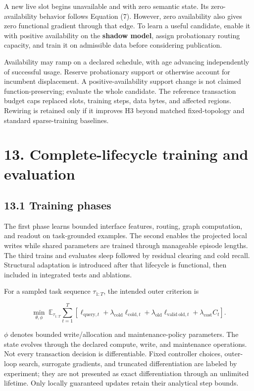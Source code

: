 \documentclass[
  11pt,
  a4paper,
]{article}
\begin{document}
A new live slot begins unavailable and with zero semantic state. Its
zero-availability behavior follows Equation (7). However, zero
availability also gives zero functional gradient through that edge. To
learn a useful candidate, enable it with positive availability on the
\textbf{shadow model}, assign probationary routing capacity, and train
it on admissible data before considering publication.

Availability may ramp on a declared schedule, with age advancing
independently of successful usage. Reserve probationary support or
otherwise account for incumbent displacement. A positive-availability
support change is not claimed function-preserving; evaluate the whole
candidate. The reference transaction budget caps replaced slots,
training steps, data bytes, and affected regions. Rewiring is retained
only if it improves H3 beyond matched fixed-topology and standard
sparse-training baselines.

\section{13. Complete-lifecycle training and
evaluation}\label{complete-lifecycle-training-and-evaluation}

\subsection{13.1 Training phases}\label{training-phases}

The first phase learns bounded interface features, routing, graph
computation, and readout on task-grounded examples. The second enables
the projected local writes while shared parameters are trained through
manageable episode lengths. The third trains and evaluates sleep
followed by residual clearing and cold recall. Structural adaptation is
introduced after that lifecycle is functional, then included in
integrated tests and ablations.

For a sampled task sequence \(\tau_{1:T}\), the intended outer criterion
is

\[
\min_{\theta,\phi}\;
\mathbb E_{\tau_{1:T}}
\sum_{t=1}^T\left[
\ell_{\mathrm{query},t}
+\lambda_{\mathrm{cold}}\ell_{\mathrm{cold},t}
+\lambda_{\mathrm{old}}\ell_{\mathrm{valid\ old},t}
+\lambda_{\mathrm{cost}}C_t
\right].
\tag{34}
\]

\(\phi\) denotes bounded write/allocation and maintenance-policy
parameters. The state evolves through the declared compute, write, and
maintenance operations. Not every transaction decision is
differentiable. Fixed controller choices, outer-loop search, surrogate
gradients, and truncated differentiation are labeled by experiment; they
are not presented as exact differentiation through an unlimited
lifetime. Only locally guaranteed updates retain their analytical step
bounds.
\end{document}
